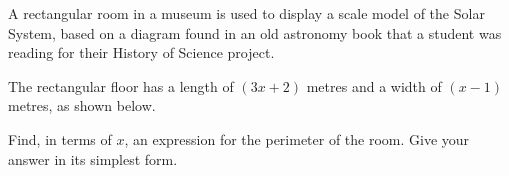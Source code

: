 \begin{question}
\noindent A rectangular room in a museum is used to display a scale model of the Solar System, based on a diagram found in an old astronomy book that a student was reading for their History of Science project.

The rectangular floor has a length of $(3x + 2)$ metres and a width of $(x - 1)$ metres, as shown below.

\begin{center}
\end{center}

Find, in terms of $x$, an expression for the perimeter of the room.
Give your answer in its simplest form.
\vspace{4cm}
\begin{flushright}
\end{flushright}
\end{question}
